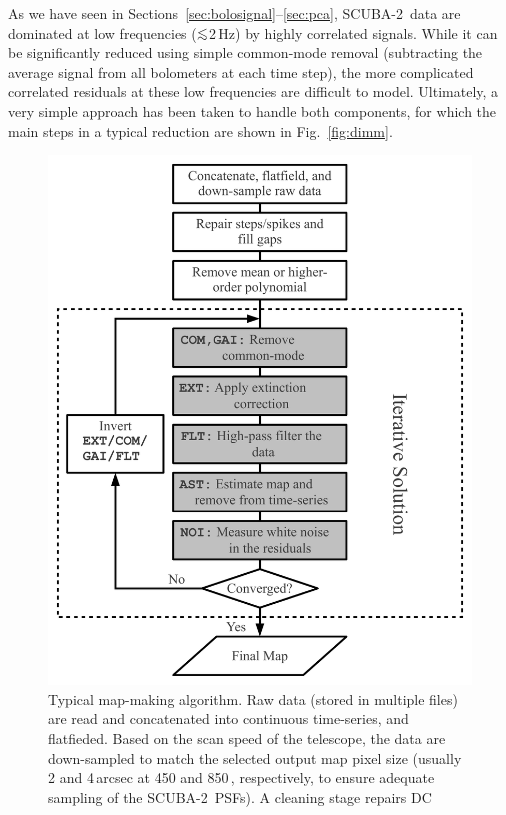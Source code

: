 \documentclass[useAMS,usenatbib,nofootinbib]{mn2e}
\newcommand{\scuba}{SCUBA-2}
\def\lsim{\mathrel{\lower2.5pt\vbox{\lineskip=0pt\baselineskip=0pt
          \hbox{$<$}\hbox{$\sim$}}}}
\begin{document}
As we have seen in Sections~\ref{sec:bolosignal}--\ref{sec:pca},
\scuba\ data are dominated at low frequencies ($\lsim$2\,Hz) by highly
correlated signals. While it can be significantly reduced using simple
common-mode removal (subtracting the average signal from all
bolometers at each time step), the more complicated correlated
residuals at these low frequencies are difficult to model. Ultimately,
a very simple approach has been taken to handle both components, for
which the main steps in a typical reduction are shown in
Fig.~\ref{fig:dimm}.

\begin{figure}
\centering
\includegraphics[width=\linewidth]{dimm}
\caption{Typical map-making algorithm. Raw data (stored in multiple
  files) are read and concatenated into continuous time-series, and
  flatfieded. Based on the scan speed of the telescope, the data are
  down-sampled to match the selected output map pixel size (usually 2
  and 4\,arcsec at 450 and 850\,\micron, respectively, to ensure
  adequate sampling of the \scuba\ PSFs). A cleaning stage repairs DC
}
\end{figure}
\end{document}
